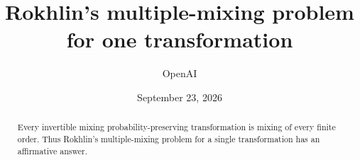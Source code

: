 \documentclass[11pt]{article}
\title{Rokhlin's multiple-mixing problem for one transformation}
\author{OpenAI}
\date{September 23, 2026}
\begin{document}
\maketitle
\vspace{-1.5\baselineskip}
\begin{abstract}
Every invertible mixing probability-preserving transformation is mixing of every finite order. Thus Rokhlin's multiple-mixing problem for a single transformation has an affirmative answer.
\end{abstract}
{\small\tableofcontents}










\end{document}
